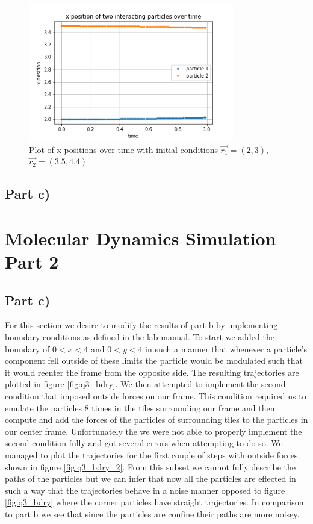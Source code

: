 \documentclass{article}
\begin{document}
\begin{figure}[H]
	\centering
	\includegraphics[width=0.8\textwidth]{../images/q2_iii_xpos.png}
	\caption{Plot of x positions over time with initial conditions $\vec{r_1}=(2,3)$, $\vec{r_2}=(3.5,4.4)$}
	\label{fig:q2_iii_xpos}
\end{figure}

\subsection{Part c)}

\section{Molecular Dynamics Simulation Part 2}

\subsection{Part c)}
For this section we desire to modify the results of part b by implementing boundary conditions as defined in the lab manual. To start we added the boundary of $0<x<4$ and $0<y<4$ in such a manner that whenever a particle's component fell outside of these limits the particle would be modulated such that it would reenter the frame from the opposite side. The resulting trajectories are plotted in figure \ref{fig:q3_bdry}. We then attempted to implement the second condition that imposed outside forces on our frame. This condition required us to emulate the particles 8 times in the tiles surrounding our frame and then compute and add the forces of the particles of surrounding tiles to the particles in our center frame. Unfortunately the we were not able to properly implement the second condition fully and got several errors when attempting to do so. We managed to plot the trajectories for the first couple of steps with outside forces, shown in figure \ref{fig:q3_bdry_2}. From this subset we cannot fully describe the paths of the particles but we can infer that now all the particles are effected in such a way that the trajectories behave in a noise manner opposed to figure \ref{fig:q3_bdry} where the corner particles have straight trajectories. In comparison to part b we see that since the particles are confine their paths are more noisey.
\end{document}
